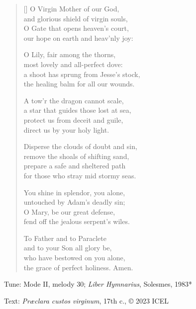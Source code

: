 \hymn

\settowidth{\versewidth}{a shoot has sprung from Jesse’s stock,}

\begin{verse}[\versewidth]
O Virgin Mother of our God,\\
and glorious shield of virgin souls,\\
O Gate that opens heaven’s court,\\
our hope on earth and heav’nly joy:

O Lily, fair among the thorns,\\
most lovely and all-perfect dove:\\
a shoot has sprung from Jesse’s stock,\\
the healing balm for all our wounds.

A tow’r the dragon cannot scale,\\
a star that guides those lost at sea,\\
protect us from deceit and guile,\\
direct us by your holy light.

Disperse the clouds of doubt and sin,\\
remove the shoals of shifting sand,\\
prepare a safe and sheltered path\\
for those who stray mid stormy seas.

You shine in splendor, you alone,\\
untouched by Adam’s deadly sin;\\
O Mary, be our great defense,\\
fend off the jealous serpent’s wiles.

To Father and to Paraclete\\
and to your Son all glory be,\\
who have bestowed on you alone,\\
the grace of perfect holiness. Amen.
\end{verse}

\begin{hymnsource}
Tune: Mode II, melody 30; \emph{Liber Hymnarius}, Solesmes, 1983*

Text: \emph{Præclara custos virginum}, 17th c., © 2023 ICEL

 


\end{hymnsource}